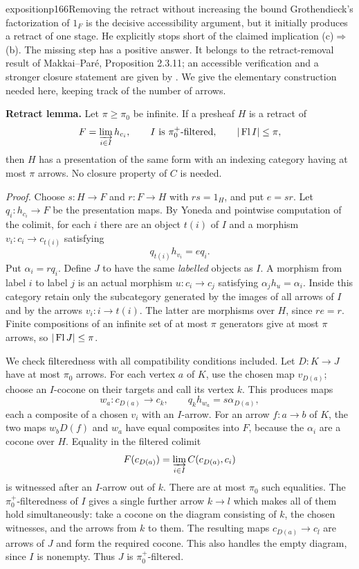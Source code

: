 \begin{dcomment}{exposition}{p166}{Removing the retract without increasing the bound}
Grothendieck's factorization of $1_F$ is the decisive accessibility argument, but it initially produces a retract of one stage. He explicitly stops short of the claimed implication (c)$\Rightarrow$(b). The missing step has a positive answer. It belongs to the retract-removal result of Makkai--Par\'e, Proposition 2.3.11; an accessible verification and a stronger closure statement are given by \citet[Corollaries 4.13 and 4.15, including footnote 2]{Chen2021Sifted}. We give the elementary construction needed here, keeping track of the number of arrows.

\textbf{Retract lemma.} Let $\pi\geq\pi_0$ be infinite. If a presheaf $H$ is a retract of
\[
 F=\varinjlim_{i\in I}h_{c_i},
 \qquad I\text{ is }\pi_0^+\text{-filtered},\qquad |\operatorname{Fl} I|\leq\pi,
\]
then $H$ has a presentation of the same form with an indexing category having at most $\pi$ arrows. No closure property of $C$ is needed.

\textit{Proof.} Choose $s:H\to F$ and $r:F\to H$ with $rs=1_H$, and put $e=sr$. Let $q_i:h_{c_i}\to F$ be the presentation maps. By Yoneda and pointwise computation of the colimit, for each $i$ there are an object $t(i)$ of $I$ and a morphism $v_i:c_i\to c_{t(i)}$ satisfying
\[
 q_{t(i)}h_{v_i}=e q_i.
\]
Put $\alpha_i=rq_i$. Define $J$ to have the same \emph{labelled} objects as $I$. A morphism from label $i$ to label $j$ is an actual morphism $u:c_i\to c_j$ satisfying $\alpha_jh_u=\alpha_i$. Inside this category retain only the subcategory generated by the images of all arrows of $I$ and by the arrows $v_i:i\to t(i)$. The latter are morphisms over $H$, since $re=r$. Finite compositions of an infinite set of at most $\pi$ generators give at most $\pi$ arrows, so $|\operatorname{Fl} J|\leq\pi$.

We check filteredness with all compatibility conditions included. Let $D:K\to J$ have at most $\pi_0$ arrows. For each vertex $a$ of $K$, use the chosen map $v_{D(a)}$; choose an $I$-cocone on their targets and call its vertex $k$. This produces maps
\[
 w_a:c_{D(a)}\longrightarrow c_k,
 \qquad q_kh_{w_a}=s\alpha_{D(a)},
\]
each a composite of a chosen $v_i$ with an $I$-arrow. For an arrow $f:a\to b$ of $K$, the two maps $w_bD(f)$ and $w_a$ have equal composites into $F$, because the $\alpha_i$ are a cocone over $H$. Equality in the filtered colimit
\[
 F(c_{D(a)})=\varinjlim_{i\in I}C(c_{D(a)},c_i)
\]
is witnessed after an $I$-arrow out of $k$. There are at most $\pi_0$ such equalities. The $\pi_0^+$-filteredness of $I$ gives a single further arrow $k\to l$ which makes all of them hold simultaneously: take a cocone on the diagram consisting of $k$, the chosen witnesses, and the arrows from $k$ to them. The resulting maps $c_{D(a)}\to c_l$ are arrows of $J$ and form the required cocone. This also handles the empty diagram, since $I$ is nonempty. Thus $J$ is $\pi_0^+$-filtered.


\end{dcomment}
